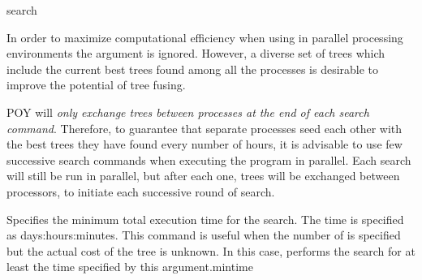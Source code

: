 \begin{command}{search}{}
\begin{arguments}

    
        \begin{statement}
        \setlength{\parindent}{0.5cm}
                In order to maximize computational efficiency when using  
                in parallel processing environments the 
                argument is ignored. However, a diverse set of trees which
                include the current best trees found among all the processes is
                desirable to improve the potential of tree fusing.

                \indent POY will \emph{only exchange trees between processes at the end
                of each search command}. Therefore,
                to guarantee that separate processes seed each other with the
                best trees they have found every number of hours,
                it is advisable to use few successive search commands
                when executing the program in parallel. Each search will still
                be run in parallel, but after each one, trees will be exchanged
                between processors, to initiate each successive round of search.
        \end{statement}
        
        {Specifies the minimum total execution time for the search. The time is specified as
        days:hours:minutes. This command is useful when
        the number of  is specified but the actual cost of the
        tree is unknown. In this case, \poy performs the search for at least the time
        specified by this argument.}{mintime}


\end{arguments}
\end{command}
